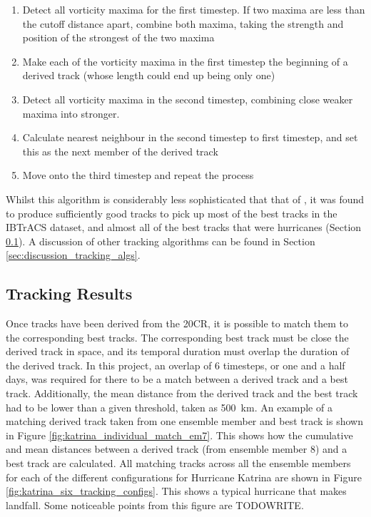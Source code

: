 \documentclass[pdftex,12pt,a4paper]{report}
\begin{document}
\begin{enumerate}
    \item Detect all vorticity maxima for the first timestep. If two maxima are less than the cutoff
        distance apart, combine both maxima, taking the strength and position of the strongest of
        the two maxima
    \item Make each of the vorticity maxima in the first timestep the beginning of a derived track
        (whose length could end up being only one)
    \item Detect all vorticity maxima in the second timestep, combining close weaker maxima into
        stronger. %
    \item Calculate nearest neighbour in the second timestep to first timestep, and set this as the
        next member of the derived track
    \item Move onto the third timestep and repeat the process
\end{enumerate}

Whilst this algorithm is considerably less sophisticated that that of \textcite{hodges1994}, it was
found to produce sufficiently good tracks to pick up most of the best tracks in the IBTrACS dataset,
and almost all of the best tracks that were hurricanes (Section  \ref{sec:results_tracking}). A
discussion of other tracking algorithms can be found in Section \ref{sec:discussion_tracking_algs}.

\subsection{Tracking Results}
\label{sec:results_tracking}

Once tracks have been derived from the 20CR, it is possible to match them to the corresponding best
tracks. The corresponding best track must be close the derived track in space, and its temporal
duration must overlap the duration of the derived track. In this project, an overlap of 6 timesteps,
or one and a half days, was required for there to be a match between a derived track and a best
track. Additionally, the mean distance from the derived track and the best track had to be lower
than a given threshold, taken as \SI{500}{km}. An example of a matching derived track taken from
one ensemble member and best track is shown in Figure \ref{fig:katrina_individual_match_em7}.
This shows how the cumulative and mean distances between a derived track (from ensemble member 8)
and a best track are calculated. All matching tracks across all the ensemble members for each of the
different configurations for Hurricane Katrina are shown in Figure
\ref{fig:katrina_six_tracking_configs}. This shows a typical hurricane that makes landfall. Some
noticeable points from this figure are TODOWRITE.
\end{document}
